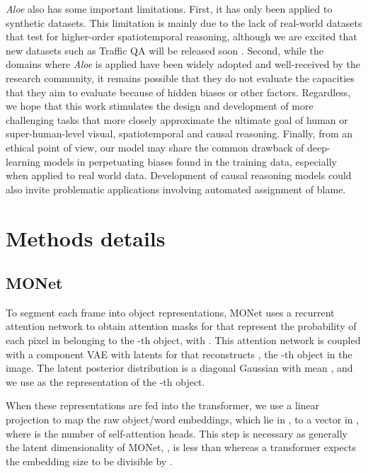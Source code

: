 \documentclass{article}
\newcommand{\Model}{\emph{Aloe}}
\begin{document}
\Model{} also has some important limitations. First, it has only been applied to synthetic datasets. This limitation is mainly due to the lack of real-world datasets that test for higher-order spatiotemporal reasoning, although we are excited that new datasets such as Traffic QA will be released soon \citep{xu2021sutd}. Second, while the domains where \Model{} is applied have been widely adopted and well-received by the research community, it remains possible that they do not evaluate the capacities that they aim to evaluate because of hidden biases or other factors. Regardless, we hope that this work stimulates the design and development of more challenging tasks that more closely approximate the ultimate goal of human or super-human-level visual, spatiotemporal and causal reasoning. Finally, from an ethical point of view, our model may share the common drawback of deep-learning models in perpetuating biases found in the training data, especially when applied to real world data. Development of causal reasoning models could also invite problematic applications involving automated assignment of blame.


\clearpage




\clearpage
\appendix

\section{Methods details}
\label{appendix:methods}
\subsection{MONet}
\label{appendix:monet}
To segment each  frame  into  object representations,
MONet uses a recurrent attention network
to obtain  attention masks  for 
that represent the probability of each pixel in  belonging to the -th object,
with . 
This attention network is coupled with a component VAE with latents  for 
that reconstructs , the -th object in the image.
The latent posterior distribution  is a diagonal Gaussian with mean ,
and we use  as the representation of the -th object.

When these representations are fed into the transformer,
we use a linear projection to map the raw object/word embeddings, which lie in ,
to a vector in ,
where  is the number of self-attention heads.
This step is necessary as generally the latent dimensionality of MONet, ,
is less than 
whereas a transformer expects the embedding size to be divisible by .
\end{document}
